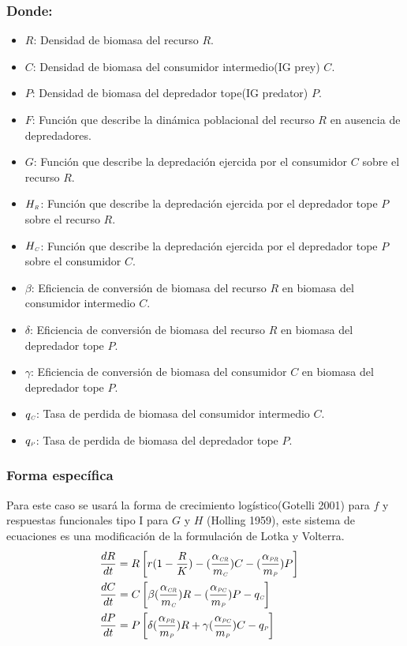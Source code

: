 \documentclass[a4paper,12pt]{article}
\newcommand{\PP}{\textit{\tiny P}}
\newcommand{\C}{\textit{\tiny C}}
\newcommand{\R}{\textit{\tiny R}}
\newcommand{\CR}{\textit{\tiny CR}}
\newcommand{\PC}{\textit{\tiny PC}}
\newcommand{\PR}{\textit{\tiny PR}}
\begin{document}
\subsubsection*{Donde:}
\begin{itemize}
\item[]$R$: Densidad de biomasa del recurso $R$.
\item[]$C$: Densidad de biomasa del consumidor intermedio(IG prey) $C$.
\item[]$P$: Densidad de biomasa del depredador tope(IG predator) $P$.
\item[]$F$: Funci\'on que describe la din\'amica poblacional del recurso $R$ en ausencia de depredadores.
\item[]$G$: Funci\'on que describe la depredaci\'on ejercida por el consumidor $C$ sobre el recurso $R$.
\item[]$H_{\R}$: Funci\'on que describe la depredaci\'on ejercida por el depredador tope $P$ sobre el recurso $R$.
\item[]$H_{\C}$: Funci\'on que describe la depredaci\'on ejercida por el depredador tope $P$ sobre el consumidor $C$.
\item[]$\beta$: Eficiencia de conversi\'on de biomasa del recurso $R$ en biomasa del consumidor intermedio $C$.
\item[]$\delta$: Eficiencia de conversi\'on de biomasa del recurso $R$ en biomasa del depredador tope $P$.
\item[]$\gamma$: Eficiencia de conversi\'on de biomasa del consumidor $C$ en biomasa del depredador tope $P$.
\item[]$q_{\C}$: Tasa de perdida de biomasa del consumidor intermedio $C$.
\item[]$q_{\textit{\tiny P}}$: Tasa de perdida de biomasa del depredador tope $P$.
\end{itemize}
\subsubsection*{Forma espec\'ifica}
Para este caso se usar\'a la forma de crecimiento log\'istico(Gotelli 2001) para $f$ y respuestas funcionales tipo I para $G$ y $H$ (Holling 1959), este sistema de ecuaciones es una modificaci\'on de la formulaci\'on de Lotka y Volterra.
\begin{align}
&\frac{dR}{dt} = R \left[ r(1-\frac{R}{K}) -(\frac{\alpha_{\CR}}{m_\C})C-(\frac{\alpha_{\PR}}{m_\textit{\tiny P}})P \right] &\\
&\frac{dC}{dt} = C \left[ \beta(\frac{\alpha_{\CR}}{m_\C})R-(\frac{\alpha_{\PC}}{m_\PP})P -q_{\C}  \right]\\
&\frac{dP}{dt} = P \left[ \delta (\frac{\alpha_{\PR}}{m_\PP})R  +\gamma (\frac{\alpha_{\PC}}{m_\PP})C-q_{\PP} \right]
\end{align}
\end{document}
